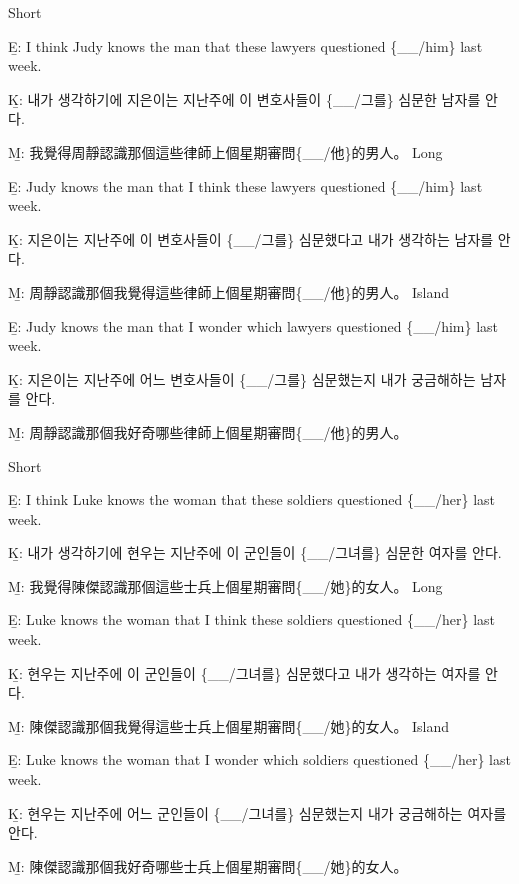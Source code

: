 \pex %
\a Short\par\nobreak
\beginsubsub
\b{E:} I think Judy knows the man that these lawyers questioned \{\_\_/him\} last week.\par\nobreak
\b{K:} \ko 내가 생각하기에 지은이는 지난주에 이 변호사들이 \{\_\_/그를\} 심문한 남자를 안다. \normalfont\par\nobreak
\b{M:} \zh 我覺得周靜認識那個這些律師上個星期審問\{\_\_/他\}的男人。 \normalfont
\endsubsub
\a Long\par\nobreak
\beginsubsub
\b{E:} Judy knows the man that I think these lawyers questioned \{\_\_/him\} last week.\par\nobreak
\b{K:} \ko 지은이는 지난주에 이 변호사들이 \{\_\_/그를\} 심문했다고 내가 생각하는 남자를 안다. \normalfont\par\nobreak
\b{M:} \zh 周靜認識那個我覺得這些律師上個星期審問\{\_\_/他\}的男人。 \normalfont
\endsubsub
\a Island\par\nobreak
\beginsubsub
\b{E:} Judy knows the man that I wonder which lawyers questioned \{\_\_/him\} last week.\par\nobreak
\b{K:} \ko 지은이는 지난주에 어느 변호사들이 \{\_\_/그를\} 심문했는지 내가 궁금해하는 남자를 안다\normalfont.\par\nobreak
\b{M:} \zh 周靜認識那個我好奇哪些律師上個星期審問\{\_\_/他\}的男人。\normalfont
\endsubsub
\xe

\pex %
\a Short\par\nobreak
\beginsubsub
\b{E:} I think Luke knows the woman that these soldiers questioned \{\_\_/her\} last week.\par\nobreak
\b{K:} \ko 내가 생각하기에 현우는 지난주에 이 군인들이 \{\_\_/그녀를\} 심문한 여자를 안다. \normalfont\par\nobreak
\b{M:} \zh 我覺得陳傑認識那個這些士兵上個星期審問\{\_\_/她\}的女人。 \normalfont
\endsubsub
\a Long\par\nobreak
\beginsubsub
\b{E:} Luke knows the woman that I think these soldiers questioned \{\_\_/her\} last week.\par\nobreak
\b{K:} \ko 현우는 지난주에 이 군인들이 \{\_\_/그녀를\} 심문했다고 내가 생각하는 여자를 안다. \normalfont\par\nobreak
\b{M:} \zh 陳傑認識那個我覺得這些士兵上個星期審問\{\_\_/她\}的女人。 \normalfont
\endsubsub
\a Island\par\nobreak
\beginsubsub
\b{E:} Luke knows the woman that I wonder which soldiers questioned \{\_\_/her\} last week.\par\nobreak
\b{K:} \ko 현우는 지난주에 어느 군인들이 \{\_\_/그녀를\} 심문했는지 내가 궁금해하는 여자를 안다\normalfont.\par\nobreak
\b{M:} \zh 陳傑認識那個我好奇哪些士兵上個星期審問\{\_\_/她\}的女人。\normalfont
\endsubsub
\xe

